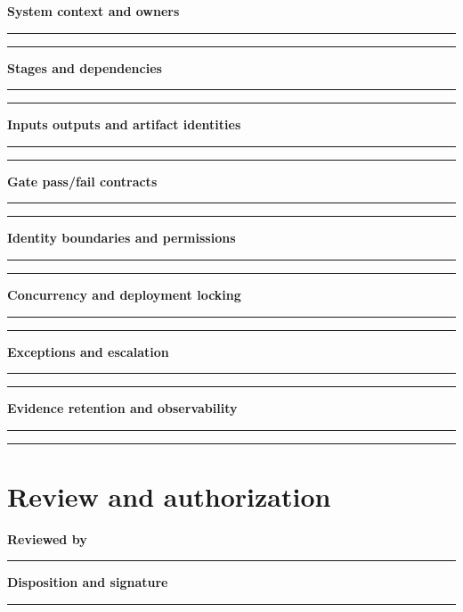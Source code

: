 \documentclass[10pt,letterpaper]{article}
\begin{document}
\textbf{System context and owners}\par
\noindent\rule{\linewidth}{0.35pt}\par\vspace{0.7em}
\noindent\rule{\linewidth}{0.35pt}\par\vspace{0.7em}
\textbf{Stages and dependencies}\par
\noindent\rule{\linewidth}{0.35pt}\par\vspace{0.7em}
\noindent\rule{\linewidth}{0.35pt}\par\vspace{0.7em}
\textbf{Inputs outputs and artifact identities}\par
\noindent\rule{\linewidth}{0.35pt}\par\vspace{0.7em}
\noindent\rule{\linewidth}{0.35pt}\par\vspace{0.7em}
\textbf{Gate pass/fail contracts}\par
\noindent\rule{\linewidth}{0.35pt}\par\vspace{0.7em}
\noindent\rule{\linewidth}{0.35pt}\par\vspace{0.7em}
\textbf{Identity boundaries and permissions}\par
\noindent\rule{\linewidth}{0.35pt}\par\vspace{0.7em}
\noindent\rule{\linewidth}{0.35pt}\par\vspace{0.7em}
\textbf{Concurrency and deployment locking}\par
\noindent\rule{\linewidth}{0.35pt}\par\vspace{0.7em}
\noindent\rule{\linewidth}{0.35pt}\par\vspace{0.7em}
\textbf{Exceptions and escalation}\par
\noindent\rule{\linewidth}{0.35pt}\par\vspace{0.7em}
\noindent\rule{\linewidth}{0.35pt}\par\vspace{0.7em}
\textbf{Evidence retention and observability}\par
\noindent\rule{\linewidth}{0.35pt}\par\vspace{0.7em}
\noindent\rule{\linewidth}{0.35pt}\par\vspace{0.7em}
\section{Review and authorization}
\textbf{Reviewed by}\par
\noindent\rule{\linewidth}{0.35pt}\par\vspace{0.7em}
\textbf{Disposition and signature}\par
\noindent\rule{\linewidth}{0.35pt}\par\vspace{0.7em}
\end{document}
